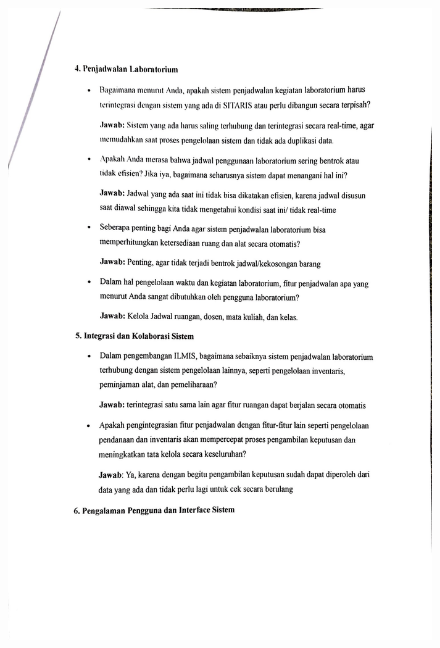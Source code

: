 \begin{figure}[h]
	\centering
	\includegraphics[width=0.82\linewidth]{konten/gambar/wawancara/wawancara_3.jpg}

	\label{fig:hasil-wawancara}
\end{figure}
